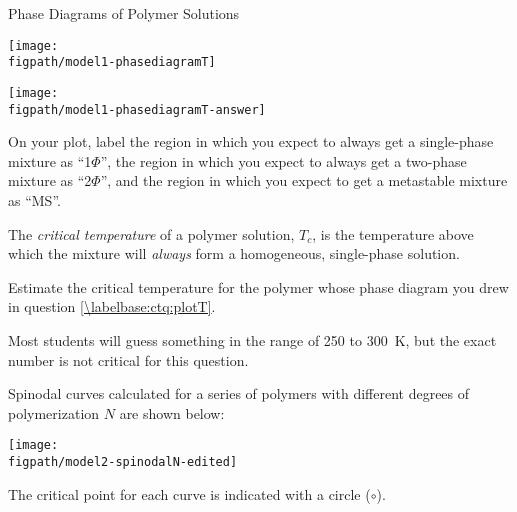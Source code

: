 \begin{activity}{Phase Diagrams of Polymer Solutions}
\begin{ctqs}
		\begin{solution}[2in]{\centerline{\texttt{[image: \\figpath/model1-phasediagramT]}}}
		\centerline{\texttt{[image: \\figpath/model1-phasediagramT-answer]}}
		\end{solution}
		
	\question On your plot, label the region in which you expect to always get a single-phase mixture as ``1$\Phi$'', the region in which you expect to always get a two-phase mixture as ``2$\Phi$'', and the region in which you expect to get a metastable mixture as ``MS''.
		
		
\end{ctqs}


\begin{infobox}

	The \emph{critical temperature} of a polymer solution, $T_c$, is the temperature above which the mixture will \emph{always} form a homogeneous, single-phase solution.

\end{infobox}


\begin{ctqs}
	\question Estimate the critical temperature for the polymer whose phase diagram you drew in question \ref{\labelbase:ctq:plotT}.
	
		\begin{solution}[0.25in]{}
		
			Most students will guess something in the range of 250 to 300~K, but the exact number is not critical for this question.
		
		\end{solution}
		
\end{ctqs}



\begin{model}
	\label{\labelbase:mdl:Ndependence}

	Spinodal curves calculated for a series of polymers with different degrees of polymerization $N$ are shown below:
	
	\centerline{\texttt{[image: \\figpath/model2-spinodalN-edited]}}
	
	The critical point for each curve is indicated with a circle ($\circ$).
	
\end{model}

\begin{ctqs}


\end{ctqs}
\end{activity}
